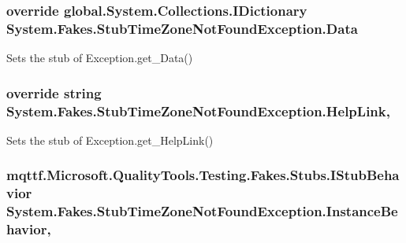 \hypertarget{class_system_1_1_fakes_1_1_stub_time_zone_not_found_exception_abb79ce20b5fb7e3b34190949a1da76cc}{
\subsubsection[{Data}]{\setlength{\rightskip}{0pt plus 5cm}override global.\-System.\-Collections.\-I\-Dictionary System.\-Fakes.\-Stub\-Time\-Zone\-Not\-Found\-Exception.\-Data\hspace{0.3cm}{\ttfamily [get]}}}\label{class_system_1_1_fakes_1_1_stub_time_zone_not_found_exception_abb79ce20b5fb7e3b34190949a1da76cc}


Sets the stub of Exception.\-get\-\_\-\-Data()

\hypertarget{class_system_1_1_fakes_1_1_stub_time_zone_not_found_exception_aff8fe84deba7f91411e7b36c264867b1}{
\subsubsection[{Help\-Link}]{\setlength{\rightskip}{0pt plus 5cm}override string System.\-Fakes.\-Stub\-Time\-Zone\-Not\-Found\-Exception.\-Help\-Link\hspace{0.3cm}{\ttfamily [get]}, {\ttfamily [set]}}}\label{class_system_1_1_fakes_1_1_stub_time_zone_not_found_exception_aff8fe84deba7f91411e7b36c264867b1}


Sets the stub of Exception.\-get\-\_\-\-Help\-Link()

\hypertarget{class_system_1_1_fakes_1_1_stub_time_zone_not_found_exception_a01e249b3984599d2b47102c7f8803cff}{
\subsubsection[{Instance\-Behavior}]{\setlength{\rightskip}{0pt plus 5cm}mqttf.\-Microsoft.\-Quality\-Tools.\-Testing.\-Fakes.\-Stubs.\-I\-Stub\-Behavior System.\-Fakes.\-Stub\-Time\-Zone\-Not\-Found\-Exception.\-Instance\-Behavior\hspace{0.3cm}{\ttfamily [get]}, {\ttfamily [set]}}}\label{class_system_1_1_fakes_1_1_stub_time_zone_not_found_exception_a01e249b3984599d2b47102c7f8803cff}


